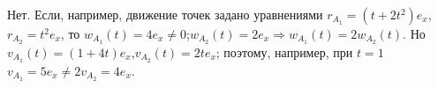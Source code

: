 Нет.  Если, например, движение  точек  задано  уравнениями 
$r_{A_{1}}=(t+2t^2)e_{x}$,$r_{A_{2}}=t^2e_{x}$, то $w_{A_{1}}(t)=4e_{x}
\ne 0$;$w_{A_{2}}(t)=2e_{x}\Rightarrow w_{A_{1}}(t)=2w_{A_{2}}(t)$.
Но $v_{A_{1}}(t)=(1+4t)e_{x}$,$v_{A_{2}}(t)=2te_{x}$;
поэтому, например, при $t=1$ $v_{A_{1}}=5e_{x}\ne 2v_{A_{2}}=4e_{x}$.
